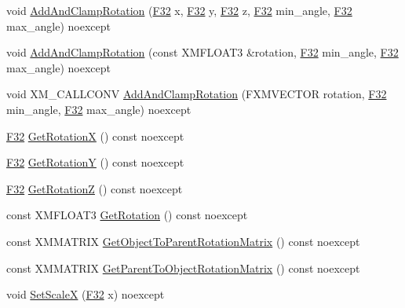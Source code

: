 \begin{DoxyCompactItemize}
void \hyperlink{classmage_1_1_transform_a7d71b079115dcfae2747191f786713e1}{Add\+And\+Clamp\+Rotation} (\hyperlink{namespacemage_aa97e833b45f06d60a0a9c4fc22ae02c0}{F32} x, \hyperlink{namespacemage_aa97e833b45f06d60a0a9c4fc22ae02c0}{F32} y, \hyperlink{namespacemage_aa97e833b45f06d60a0a9c4fc22ae02c0}{F32} z, \hyperlink{namespacemage_aa97e833b45f06d60a0a9c4fc22ae02c0}{F32} min\+\_\+angle, \hyperlink{namespacemage_aa97e833b45f06d60a0a9c4fc22ae02c0}{F32} max\+\_\+angle) noexcept
\item 
void \hyperlink{classmage_1_1_transform_a972b964a5c9ed45b6ce8e024fd18383a}{Add\+And\+Clamp\+Rotation} (const X\+M\+F\+L\+O\+A\+T3 \&rotation, \hyperlink{namespacemage_aa97e833b45f06d60a0a9c4fc22ae02c0}{F32} min\+\_\+angle, \hyperlink{namespacemage_aa97e833b45f06d60a0a9c4fc22ae02c0}{F32} max\+\_\+angle) noexcept
\item 
void X\+M\+\_\+\+C\+A\+L\+L\+C\+O\+NV \hyperlink{classmage_1_1_transform_a1d202399e423a66a7dfd773b86f42b40}{Add\+And\+Clamp\+Rotation} (F\+X\+M\+V\+E\+C\+T\+OR rotation, \hyperlink{namespacemage_aa97e833b45f06d60a0a9c4fc22ae02c0}{F32} min\+\_\+angle, \hyperlink{namespacemage_aa97e833b45f06d60a0a9c4fc22ae02c0}{F32} max\+\_\+angle) noexcept
\item 
\hyperlink{namespacemage_aa97e833b45f06d60a0a9c4fc22ae02c0}{F32} \hyperlink{classmage_1_1_transform_ad3e1b49ccac234303ff28c8aea6f8e4a}{Get\+RotationX} () const noexcept
\item 
\hyperlink{namespacemage_aa97e833b45f06d60a0a9c4fc22ae02c0}{F32} \hyperlink{classmage_1_1_transform_ac1962d03093b3671fcfb6a9b4f410628}{Get\+RotationY} () const noexcept
\item 
\hyperlink{namespacemage_aa97e833b45f06d60a0a9c4fc22ae02c0}{F32} \hyperlink{classmage_1_1_transform_a1c2ae96eb6c0d33afd406ca1685b74f5}{Get\+RotationZ} () const noexcept
\item 
const X\+M\+F\+L\+O\+A\+T3 \hyperlink{classmage_1_1_transform_a4e133167aaded2194cb16eaa30ace40b}{Get\+Rotation} () const noexcept
\item 
const X\+M\+M\+A\+T\+R\+IX \hyperlink{classmage_1_1_transform_a33204680aad4ec80d99e1f3747a0ee2b}{Get\+Object\+To\+Parent\+Rotation\+Matrix} () const noexcept
\item 
const X\+M\+M\+A\+T\+R\+IX \hyperlink{classmage_1_1_transform_a6aa076600f336e6635204a22abcdea69}{Get\+Parent\+To\+Object\+Rotation\+Matrix} () const noexcept
\item 
void \hyperlink{classmage_1_1_transform_a6adbe2205f8db80107a2046eb7a9566a}{Set\+ScaleX} (\hyperlink{namespacemage_aa97e833b45f06d60a0a9c4fc22ae02c0}{F32} x) noexcept

\end{DoxyCompactItemize}
